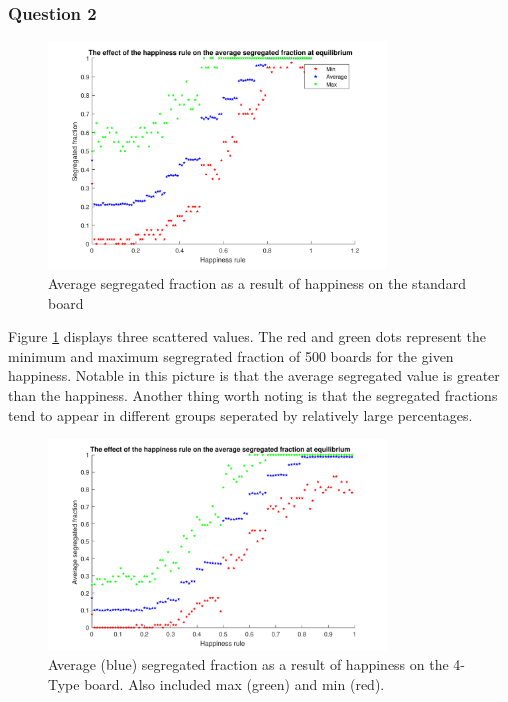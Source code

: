 \subsubsection{Question 2}
\begin{figure}[H]
    \centering
    \includegraphics[width=0.8\textwidth]{habysegfrac_sb_2}
    \caption{Average segregated fraction as a result of happiness on the standard board}
    \label{fig:happysegsb}
\end{figure}

Figure \ref{fig:happysegsb} displays three scattered values. 
The red and green dots represent the minimum and maximum segregrated fraction of 500 boards for the given happiness. 
Notable in this picture is that the average segregated value is greater than the happiness. 
Another thing worth noting is that the segregated fractions tend to appear in different groups seperated by relatively large percentages.

\begin{figure}[H]
    \centering
    \includegraphics[width=0.8\textwidth]{habysegfrac_4b_2}
    \caption{Average (blue) segregated fraction as a result of happiness on the 4-Type board. Also included max (green) and min (red).}
    \label{fig:happyseg4b}
\end{figure}

